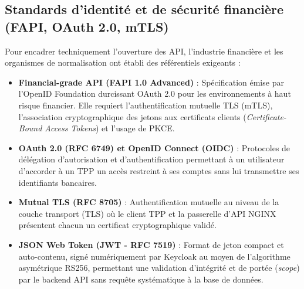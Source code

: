 \subsection{Standards d'identité et de sécurité financière (FAPI, OAuth 2.0, mTLS)}
Pour encadrer techniquement l'ouverture des API, l'industrie financière et les organismes de normalisation ont établi des référentiels exigeants :
\begin{itemize}[leftmargin=*]
    \item \textbf{Financial-grade API (FAPI 1.0 Advanced)} \cite{fapi} : Spécification émise par l'OpenID Foundation durcissant OAuth 2.0 pour les environnements à haut risque financier. Elle requiert l'authentification mutuelle TLS (mTLS), l'association cryptographique des jetons aux certificats clients (\textit{Certificate-Bound Access Tokens}) et l'usage de PKCE.
    \item \textbf{OAuth 2.0 (RFC 6749) et OpenID Connect (OIDC)} \cite{oauth2} : Protocoles de délégation d'autorisation et d'authentification permettant à un utilisateur d'accorder à un TPP un accès restreint à ses comptes sans lui transmettre ses identifiants bancaires.
    \item \textbf{Mutual TLS (RFC 8705)} \cite{rfc8705} : Authentification mutuelle au niveau de la couche transport (TLS) où le client TPP et la passerelle d'API NGINX présentent chacun un certificat cryptographique validé.
    \item \textbf{JSON Web Token (JWT - RFC 7519)} \cite{rfc7519} : Format de jeton compact et auto-contenu, signé numériquement par Keycloak au moyen de l'algorithme asymétrique RS256, permettant une validation d'intégrité et de portée (\textit{scope}) par le backend API sans requête systématique à la base de données.
\end{itemize}

